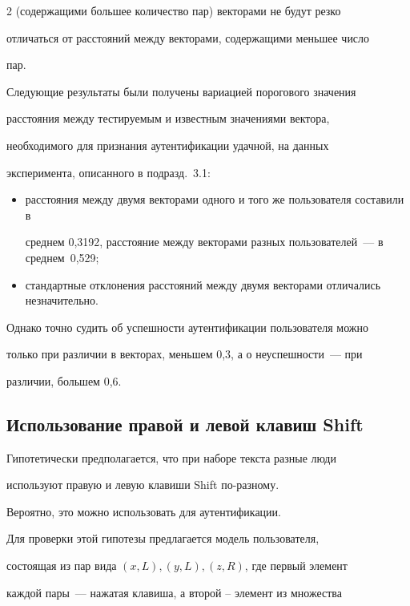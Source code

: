 \begin{multicols}{2}
(содержащими большее количество пар) векторами не будут резко

отличаться от расстояний между векторами, содержащими меньшее число

пар.



Следующие результаты были получены вариацией порогового значения

расстояния между тес\-ти\-ру\-емым и известным значениями вектора,

необходимого для признания аутентификации удачной, на данных

эксперимента, описанного в подразд.~3.1:

\begin{itemize}

    \item расстояния между двумя векторами одного и того же пользователя составили в 

    среднем 0,3192, расстояние между векторами разных пользователей~--- в среднем~0,529;

    \item стандартные отклонения расстояний между двумя векторами отличались незначительно.

\end{itemize}



Однако точно судить об успешности аутентификации пользователя можно

только при различии в векторах, меньшем 0,3, а о неуспешности~--- при

различии, большем 0,6.



\subsection{Использование правой и левой клавиш {\sf Shift}}\label{shift}



Гипотетически предполагается, что при наборе текста разные люди

используют правую и левую клавиши {\sf Shift} по-разному.

Вероятно, это можно использовать для аутентификации.



Для проверки этой гипотезы предлагается модель пользователя,

состоящая из пар вида $(x, L), (y, L), (z, R)$, где первый элемент

каждой пары~--- нажатая клавиша, а второй -- элемент из множества


\end{multicols}
